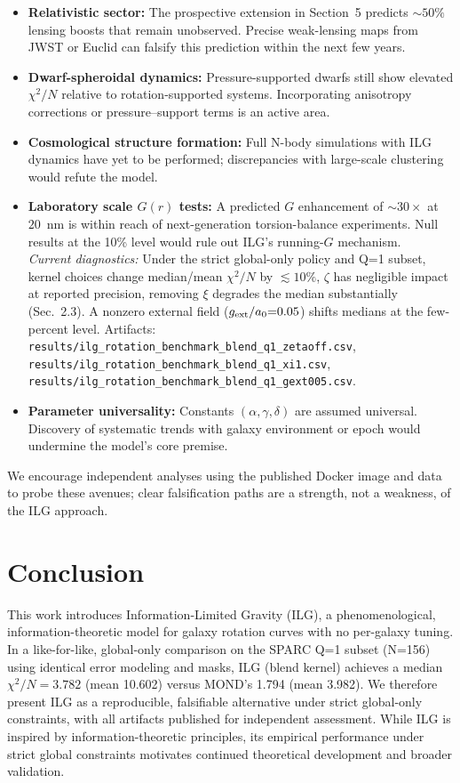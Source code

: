 \documentclass[12pt,a4paper]{article}
\begin{document}
\begin{itemize}
  \item \textbf{Relativistic sector:} The prospective extension in Section~5 predicts $\sim 50\%$ lensing boosts that remain unobserved.  Precise weak-lensing maps from JWST or Euclid can falsify this prediction within the next few years.
  \item \textbf{Dwarf-spheroidal dynamics:} Pressure-supported dwarfs still show elevated $\chi^2/N$ relative to rotation-supported systems.  Incorporating anisotropy corrections or pressure–support terms is an active area.
  \item \textbf{Cosmological structure formation:} Full N-body simulations with ILG dynamics have yet to be performed; discrepancies with large-scale clustering would refute the model.
  \item \textbf{Laboratory scale $G(r)$ tests:} A predicted $G$ enhancement of $\sim 30\times$ at $20$~nm is within reach of next-generation torsion-balance experiments.  Null results at the 10\% level would rule out ILG's running-$G$ mechanism.\\
  \textit{Current diagnostics:} Under the strict global-only policy and Q=1 subset, kernel choices change median/mean $\chi^2/N$ by $\lesssim 10\%$, $\zeta$ has negligible impact at reported precision, removing $\xi$ degrades the median substantially (Sec.~2.3). A nonzero external field ($g_{\rm ext}/a_0{=}0.05$) shifts medians at the few-percent level. Artifacts: \texttt{results/ilg\_rotation\_benchmark\_blend\_q1\_zetaoff.csv}, \texttt{results/ilg\_rotation\_benchmark\_blend\_q1\_xi1.csv}, \texttt{results/ilg\_rotation\_benchmark\_blend\_q1\_gext005.csv}.
  \item \textbf{Parameter universality:} Constants $(\alpha, \gamma, \delta)$ are assumed universal.  Discovery of systematic trends with galaxy environment or epoch would undermine the model's core premise.
\end{itemize}

We encourage independent analyses using the published Docker image and data to probe these avenues; clear falsification paths are a strength, not a weakness, of the ILG approach.

\section{Conclusion}

This work introduces Information-Limited Gravity (ILG), a phenomenological, information-theoretic model for galaxy rotation curves with no per-galaxy tuning. In a like-for-like, global-only comparison on the SPARC Q=1 subset (N=156) using identical error modeling and masks, ILG (blend kernel) achieves a median $\chi^2/N = 3.782$ (mean 10.602) versus MOND's 1.794 (mean 3.982). We therefore present ILG as a reproducible, falsifiable alternative under strict global-only constraints, with all artifacts published for independent assessment.
While ILG is inspired by information-theoretic principles, its empirical performance under strict global constraints motivates continued theoretical development and broader validation.
\end{document}
